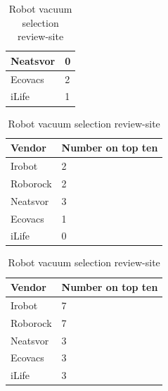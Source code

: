 \begin{table}[H]
\begin{subtable}[b]{0.45\linewidth}
\begin{tabular}{|l|l|}
            Neatsvor    & 0                 \\                   \hline
            Ecovacs     & 2                 \\                   \hline
            iLife       & 1                 \\                   \hline
        \end{tabular}
    \end{subtable}
    \begin{subtable}[b]{0.45\linewidth}
        \centering
        \caption{Results from review-site \cite{robotsel13}}
        \begin{tabular}{|l|l|}
            \hline
            \textbf{Vendor}    & \textbf{Number on top ten} \\ \hline
            Irobot      & 2                 \\                   \hline
            Roborock    & 2                 \\                   \hline
            Neatsvor    & 3                 \\                   \hline
            Ecovacs     & 1                 \\                   \hline
            iLife       & 0                 \\                   \hline
        \end{tabular}
    \end{subtable}
    \hspace{0.5cm}
    \begin{subtable}[b]{0.45\linewidth}
        \centering
        \caption{Summary of all review-sites}
        \begin{tabular}{|l|l|}
            \hline
            \textbf{Vendor}    & \textbf{Number on top ten} \\ \hline
            Irobot      & 7                 \\                   \hline
            Roborock    & 7                 \\                   \hline
            Neatsvor    & 3                 \\                   \hline
            Ecovacs     & 3                 \\                   \hline
            iLife       & 3                 \\                   \hline
        \end{tabular}
    \end{subtable}
    \caption{Robot vacuum selection review-site}
    \label{tab:Robotreviewsites}
\end{table}

